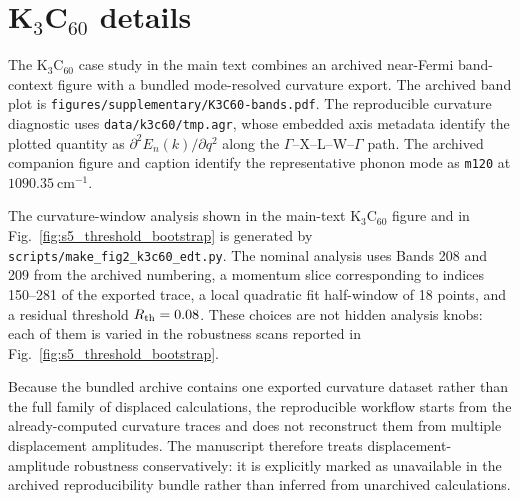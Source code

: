 \section{K$_3$C$_{60}$ details}

The K$_3$C$_{60}$ case study in the main text combines an archived near-Fermi band-context figure with a bundled mode-resolved curvature export. The archived band plot is \texttt{figures/supplementary/K3C60-bands.pdf}. The reproducible curvature diagnostic uses \texttt{data/k3c60/tmp.agr}, whose embedded axis metadata identify the plotted quantity as $\partial^2 E_n(k)/\partial q^2$ along the $\Gamma$--X--L--W--$\Gamma$ path. The archived companion figure and caption identify the representative phonon mode as \texttt{m120} at $1090.35~\mathrm{cm}^{-1}$.

The curvature-window analysis shown in the main-text K$_3$C$_{60}$ figure and in Fig.~\ref{fig:s5_threshold_bootstrap} is generated by \texttt{scripts/make\_fig2\_k3c60\_edt.py}. The nominal analysis uses Bands 208 and 209 from the archived numbering, a momentum slice corresponding to indices 150--281 of the exported trace, a local quadratic fit half-window of 18 points, and a residual threshold $R_{\rm th}=0.08$. These choices are not hidden analysis knobs: each of them is varied in the robustness scans reported in Fig.~\ref{fig:s5_threshold_bootstrap}.

Because the bundled archive contains one exported curvature dataset rather than the full family of displaced calculations, the reproducible workflow starts from the already-computed curvature traces and does not reconstruct them from multiple displacement amplitudes. The manuscript therefore treats displacement-amplitude robustness conservatively: it is explicitly marked as unavailable in the archived reproducibility bundle rather than inferred from unarchived calculations.
